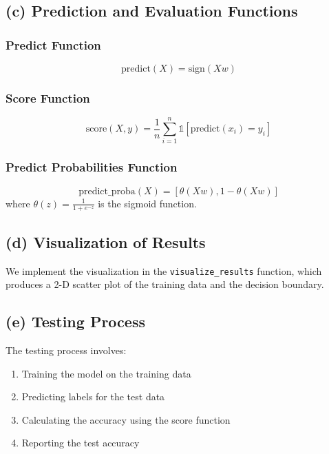 \documentclass{article}
\begin{document}
\subsection*{(c) Prediction and Evaluation Functions}

\subsubsection*{Predict Function}
\begin{equation*}
\text{predict}(X) = \text{sign}(Xw)
\end{equation*}

\subsubsection*{Score Function}
\begin{equation*}
\text{score}(X, y) = \frac{1}{n}\sum_{i=1}^n \mathbb{1}[\text{predict}(x_i) = y_i]
\end{equation*}

\subsubsection*{Predict Probabilities Function}
\begin{equation*}
\text{predict\_proba}(X) = [\theta(Xw), 1 - \theta(Xw)]
\end{equation*}
where $\theta(z) = \frac{1}{1 + e^{-z}}$ is the sigmoid function.

\subsection*{(d) Visualization of Results}
We implement the visualization in the \texttt{visualize\_results} function, which produces a 2-D scatter plot of the training data and the decision boundary.

\subsection*{(e) Testing Process}
The testing process involves:
\begin{enumerate}
    \item Training the model on the training data
    \item Predicting labels for the test data
    \item Calculating the accuracy using the score function
    \item Reporting the test accuracy
\end{enumerate}
\end{document}
